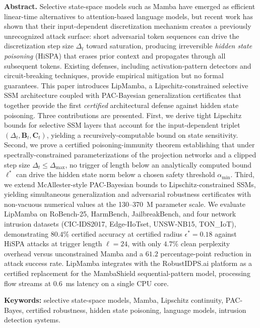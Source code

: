 \documentclass[12pt,a4paper]{article}
\theoremstyle{definition}
\theoremstyle{remark}
\newcommand{\modelname}{LipMamba}
\begin{document}
\noindent\textbf{Abstract.}
Selective state-space models such as Mamba have emerged as efficient linear-time alternatives to attention-based language models, but recent work has shown that their input-dependent discretization mechanism creates a previously unrecognized attack surface: short adversarial token sequences can drive the discretization step size $\Delta_t$ toward saturation, producing irreversible \emph{hidden state poisoning} (HiSPA) that erases prior context and propagates through all subsequent tokens. Existing defenses, including activation-pattern detectors and circuit-breaking techniques, provide empirical mitigation but no formal guarantees. This paper introduces \modelname{}, a Lipschitz-constrained selective SSM architecture coupled with PAC-Bayesian generalization certificates that together provide the first \emph{certified} architectural defense against hidden state poisoning. Three contributions are presented. First, we derive tight Lipschitz bounds for selective SSM layers that account for the input-dependent triplet $(\Delta_t, \mathbf{B}_t, \mathbf{C}_t)$, yielding a recursively-computable bound on state sensitivity. Second, we prove a certified poisoning-immunity theorem establishing that under spectrally-constrained parameterizations of the projection networks and a clipped step size $\Delta_t \leq \Delta_{\max}$, no trigger of length below an analytically computed bound $\ell^*$ can drive the hidden state norm below a chosen safety threshold $\alpha_{\min}$. Third, we extend McAllester-style PAC-Bayesian bounds to Lipschitz-constrained SSMs, yielding simultaneous generalization and adversarial robustness certificates with non-vacuous numerical values at the 130--370~M parameter scale. We evaluate \modelname{} on RoBench-25, HarmBench, JailbreakBench, and four network intrusion datasets (CIC-IDS2017, Edge-IIoTset, UNSW-NB15, TON\_IoT), demonstrating $80.4\%$ certified accuracy at certified radius $\epsilon^*=0.18$ against HiSPA attacks at trigger length $\ell=24$, with only $4.7\%$ clean perplexity overhead versus unconstrained Mamba and a $61.2$ percentage-point reduction in attack success rate. \modelname{} integrates with the RobustIDPS.ai platform as a certified replacement for the MambaShield sequential-pattern model, processing flow streams at $0.6$~ms latency on a single CPU core.

\vspace{0.4em}

\noindent\textbf{Keywords:} selective state-space models, Mamba, Lipschitz continuity, PAC-Bayes, certified robustness, hidden state poisoning, language models, intrusion detection systems.
\end{document}
